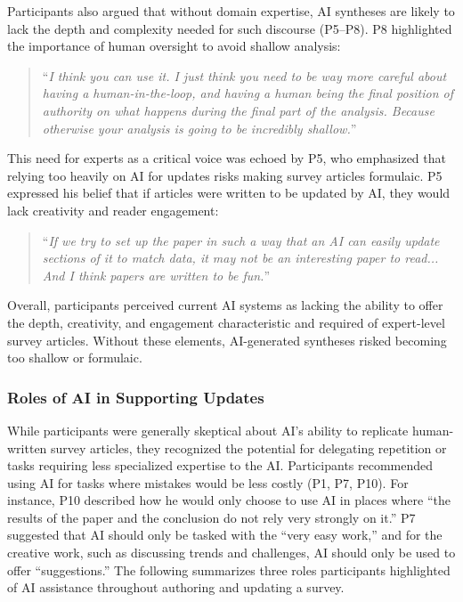Participants also argued that without domain expertise, AI syntheses are likely to lack the depth and complexity needed for such discourse (P5--P8). P8 highlighted the importance of human oversight to avoid shallow analysis:
\begin{quote}
    ``\textit{I think you can use it. I just think you need to be way more careful about having a human-in-the-loop, and having a human being the final position of authority on what happens during the final part of the analysis. Because otherwise your analysis is going to be incredibly shallow.}''
\end{quote}
This need for experts as a critical voice was echoed by P5, who emphasized that relying too heavily on AI for updates risks making survey articles formulaic. P5 expressed his belief that if articles were written to be updated by AI, they would lack creativity and reader engagement:
\begin{quote}
    ``\textit{If we try to set up the paper in such a way that an AI can easily update sections of it to match data, it may not be an interesting paper to read... And I think papers are written to be fun.}''
\end{quote}
Overall, participants perceived current AI systems as lacking the ability to offer the depth, creativity, and engagement characteristic and required of expert-level survey articles. Without these elements, AI-generated syntheses risked becoming too shallow or formulaic.

\subsubsection{Roles of AI in Supporting Updates}
While participants were generally skeptical about AI's ability to replicate human-written survey articles, they recognized the potential for delegating repetition or tasks requiring less specialized expertise to the AI. Participants recommended using AI for tasks where mistakes would be less costly (P1, P7, P10). For instance, P10 described how he would only choose to use AI in places where ``the results of the paper and the conclusion do not rely very strongly on it.'' P7 suggested that AI should only be tasked with the ``very easy work,'' and for the creative work, such as discussing trends and challenges, AI should only be used to offer ``suggestions.'' The following summarizes three roles participants highlighted of AI assistance throughout authoring and updating a survey.

